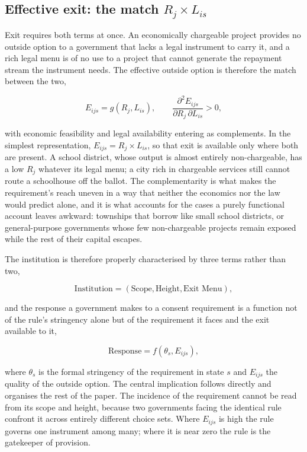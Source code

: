 \subsection{Effective exit: the match $R_j \times L_{is}$}

Exit requires both terms at once. An economically chargeable project provides
no outside option to a government that lacks a legal instrument to carry it, and
a rich legal menu is of no use to a project that cannot generate the repayment
stream the instrument needs. The effective outside option is therefore the
match between the two,

\[
E_{ijs} = g(R_j, L_{is}),
\qquad
\frac{\partial^2 E_{ijs}}{\partial R_j \, \partial L_{is}} > 0,
\]

with economic feasibility and legal availability entering as complements. In
the simplest representation, $E_{ijs} = R_j \times L_{is}$, so that exit is
available only where both are present. A school district, whose output is
almost entirely non-chargeable, has a low $R_j$ whatever its legal menu; a city
rich in chargeable services still cannot route a schoolhouse off the ballot.
The complementarity is what makes the requirement's reach uneven in a way that
neither the economics nor the law would predict alone, and it is what accounts
for the cases a purely functional account leaves awkward: townships that borrow
like small school districts, or general-purpose governments whose few
non-chargeable projects remain exposed while the rest of their capital escapes.

The institution is therefore properly characterised by three terms rather than
two,

\[
\text{Institution} = (\text{Scope}, \text{Height}, \text{Exit Menu}),
\]

and the response a government makes to a consent requirement is a function not
of the rule's stringency alone but of the requirement it faces and the exit
available to it,

\[
\text{Response} = f(\theta_s, E_{ijs}),
\]

where $\theta_s$ is the formal stringency of the requirement in state $s$ and
$E_{ijs}$ the quality of the outside option. The central implication follows
directly and organises the rest of the paper. The incidence of the requirement
cannot be read from its scope and height, because two governments facing the
identical rule confront it across entirely different choice sets. Where
$E_{ijs}$ is high the rule governs one instrument among many; where it is near
zero the rule is the gatekeeper of provision.
